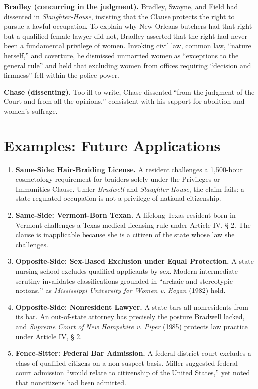 \documentclass[12pt]{article}
\begin{document}
\textbf{Bradley (concurring in the judgment).} Bradley, Swayne, and Field had dissented in \textit{Slaughter-House}, insisting that the Clause protects the right to pursue a lawful occupation. To explain why New Orleans butchers had that right but a qualified female lawyer did not, Bradley asserted that the right had never been a fundamental privilege of women. Invoking civil law, common law, ``nature herself,'' and coverture, he dismissed unmarried women as ``exceptions to the general rule'' and held that excluding women from offices requiring ``decision and firmness'' fell within the police power.

\textbf{Chase (dissenting).} Too ill to write, Chase dissented ``from the judgment of the Court and from all the opinions,'' consistent with his support for abolition and women's suffrage.

\section{Examples: Future Applications}

\begin{enumerate}
\item \textbf{Same-Side: Hair-Braiding License.} A resident challenges a 1,500-hour cosmetology requirement for braiders solely under the Privileges or Immunities Clause. Under \textit{Bradwell} and \textit{Slaughter-House}, the claim fails: a state-regulated occupation is not a privilege of national citizenship.
\item \textbf{Same-Side: Vermont-Born Texan.} A lifelong Texas resident born in Vermont challenges a Texas medical-licensing rule under Article IV, \S{} 2. The clause is inapplicable because she is a citizen of the state whose law she challenges.
\item \textbf{Opposite-Side: Sex-Based Exclusion under Equal Protection.} A state nursing school excludes qualified applicants by sex. Modern intermediate scrutiny invalidates classifications grounded in ``archaic and stereotypic notions,'' as \textit{Mississippi University for Women v. Hogan} (1982) held.
\item \textbf{Opposite-Side: Nonresident Lawyer.} A state bars all nonresidents from its bar. An out-of-state attorney has precisely the posture Bradwell lacked, and \textit{Supreme Court of New Hampshire v. Piper} (1985) protects law practice under Article IV, \S{} 2.
\item \textbf{Fence-Sitter: Federal Bar Admission.} A federal district court excludes a class of qualified citizens on a non-suspect basis. Miller suggested federal-court admission ``would relate to citizenship of the United States,'' yet noted that noncitizens had been admitted.
\end{enumerate}
\end{document}
